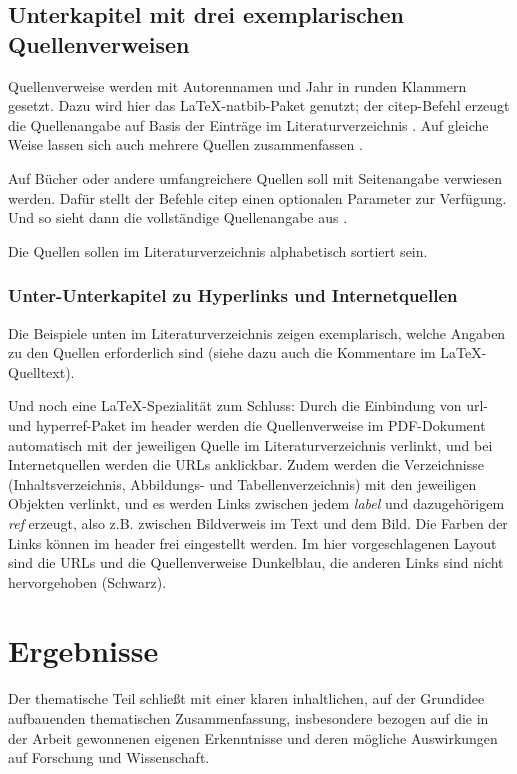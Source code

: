 \section{Unterkapitel mit drei exemplarischen Quellenverweisen}

Quellenverweise werden mit Autorennamen und Jahr in runden Klammern gesetzt. Dazu wird hier das \LaTeX-natbib-Paket genutzt; der citep-Befehl erzeugt die Quellenangabe auf Basis der Einträge im Literaturverzeichnis \citep{bluray}. Auf gleiche Weise lassen sich auch mehrere Quellen zusammenfassen \citep{dooley_streicher,stephenson}. 

Auf Bücher oder andere umfangreichere Quellen soll mit Seitenangabe verwiesen werden. Dafür stellt der Befehle citep  einen optionalen Parameter zur Verfügung. Und so sieht dann die vollständige Quellenangabe aus \citep[116]{kuttruff}. 

Die Quellen sollen im Literaturverzeichnis alphabetisch sortiert sein.


\subsection{Unter-Unterkapitel zu Hyperlinks und Internetquellen}

Die Beispiele unten im Literaturverzeichnis zeigen exemplarisch, welche Angaben zu den Quellen erforderlich sind (siehe dazu auch die Kommentare im \LaTeX-Quelltext). 

Und noch eine \LaTeX-Spezialität zum Schluss: Durch die Einbindung von url- und hyperref-Paket im header werden die Quellenverweise im PDF-Dokument automatisch mit der jeweiligen Quelle im Literaturverzeichnis verlinkt, und bei Internetquellen werden die URLs anklickbar. Zudem werden die Verzeichnisse (Inhaltsverzeichnis, Abbildungs- und Tabellenverzeichnis) mit den jeweiligen Objekten verlinkt, und es werden Links zwischen jedem \emph{label} und  dazugehörigem \emph{ref} erzeugt, also z.B. zwischen Bildverweis im Text und dem Bild. Die Farben der Links können im header frei eingestellt werden. Im hier vorgeschlagenen Layout sind die URLs und die Quellenverweise Dunkelblau, die anderen Links sind nicht hervorgehoben (Schwarz). 


\chapter{Ergebnisse}

Der thematische Teil schließt mit einer klaren inhaltlichen, auf der Grundidee aufbauenden thematischen Zusammenfassung, insbesondere bezogen auf die in der Arbeit gewonnenen eigenen Erkenntnisse und deren mögliche Auswirkungen auf Forschung und Wissenschaft. 

